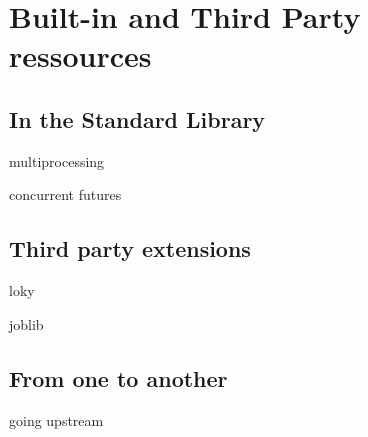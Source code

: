 \documentclass[14pt, usenames,dvipsnames]{beamer} %
\begin{document}



\section{Built-in and Third Party ressources}
    \subsection{In the Standard Library}
        \begin{frame}[t]{multiprocessing}

        \end{frame}
        \begin{frame}[t]{concurrent futures}

        \end{frame}
    \subsection{Third party extensions}
        \begin{frame}[t]{loky}

        \end{frame}
        \begin{frame}[t]{joblib}

        \end{frame}
    \subsection{From one to another}
        \begin{frame}[t]{going upstream}

        \end{frame}
\end{document}
